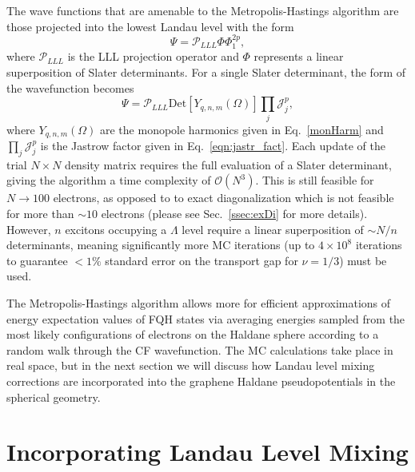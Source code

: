     The wave functions that are amenable to the Metropolis-Hastings algorithm are those projected into the lowest Landau level with the form
    \begin{equation}\label{eqn:mc_wav}
    \Psi=\mathcal{P}_{LLL}\Phi\Phi_1^{2p}, 
    \end{equation}
    where $\mathcal{P}_{LLL}$ is the LLL projection operator and $\Phi$ represents a linear superposition of Slater determinants. For a single Slater determinant, the form of the wavefunction becomes
    \begin{equation}\label{eqn:slat_det}
    \Psi=\mathcal{P}_{LLL}\mathrm{Det}[Y_{q,n,m}(\Omega)]\prod_{j}\mathcal{J}^p_j,
    \end{equation}
    where $Y_{q,n,m}(\Omega)$ are the monopole harmonics given in Eq.~\ref{monHarm} and $\prod_{j}\mathcal{J}^p_j$ is the Jastrow factor given in Eq.~\ref{eqn:jastr_fact}. Each update of the trial $N\times N$ density matrix requires the full evaluation of a Slater determinant, giving the algorithm a time complexity of $\mathcal{O}(N^3)$. This is still feasible for $N\rightarrow100$ electrons, as opposed to to exact diagonalization which is not feasible for more than $\sim10$ electrons (please see Sec.~\ref{ssec:exDi} for more details). However, $n$ excitons occupying a $\Lambda$ level require a linear superposition of $\sim N/n$ determinants, meaning significantly more MC iterations (up to $4\times10^8$ iterations to guarantee $<1\%$ standard error on the transport gap for $\nu=1/3$) must be used. 
    
    The Metropolis-Hastings algorithm allows more for efficient approximations of energy expectation values of FQH states via averaging energies sampled from the most likely configurations of electrons on the Haldane sphere according to a random walk through the CF wavefunction. The MC calculations take place in real space, but in the next section we will discuss how Landau level mixing corrections are incorporated into the graphene Haldane pseudopotentials in the spherical geometry. 
    
\section{Incorporating Landau Level Mixing} \label{sec:incLandLevMix}

